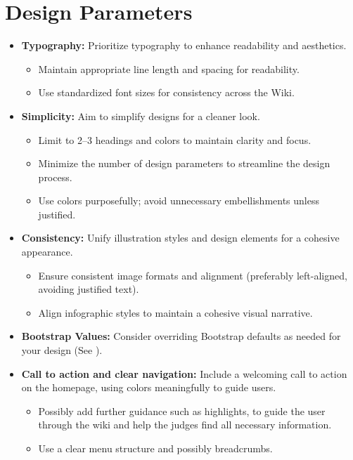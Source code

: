 \section{Design Parameters} \label{sec:design-paramaters} 
\begin{itemize}
    \item \textbf{Typography:} Prioritize typography to enhance readability and aesthetics.
    \begin{itemize}
        \item Maintain appropriate line length and spacing for readability.
        \item Use standardized font sizes for consistency across the Wiki.
    \end{itemize}
    \item \textbf{Simplicity:} Aim to simplify designs for a cleaner look.
    \begin{itemize}
        \item Limit to 2--3 headings and colors to maintain clarity and focus.
        \item Minimize the number of design parameters to streamline the design process.
        \item Use colors purposefully; avoid unnecessary embellishments unless justified.
    \end{itemize}
    \item \textbf{Consistency:} Unify illustration styles and design elements for a cohesive appearance.
    \begin{itemize}
        \item Ensure consistent image formats and alignment (preferably left-aligned, avoiding justified text).
        \item Align infographic styles to maintain a cohesive visual narrative.
    \end{itemize}
    \item \textbf{Bootstrap Values:} Consider overriding Bootstrap defaults as needed for your design (See ).
    \item \textbf{Call to action and clear navigation:} Include a welcoming call to action on the homepage, using colors meaningfully to guide users.
    \begin{itemize}
        \item Possibly add further guidance such as highlights, to guide the user through the wiki and help the judges find all necessary information.
        \item Use a clear menu structure and possibly breadcrumbs.

\end{itemize}
\end{itemize}
